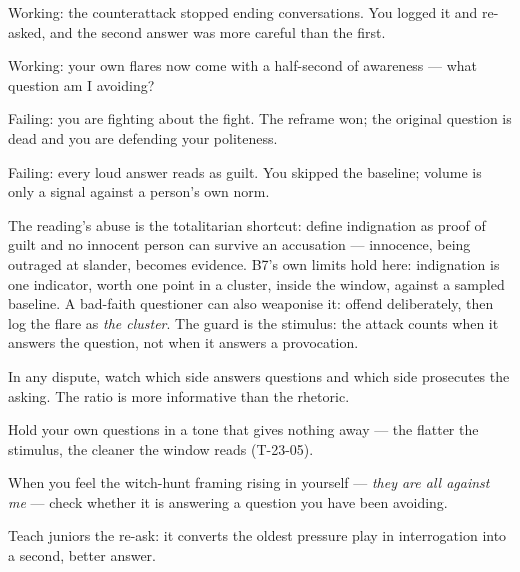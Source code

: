 \begin{feedback}
  \item Working: the counterattack stopped ending conversations. You logged it and re-asked, and the second answer was more careful than the first.
  \item Working: your own flares now come with a half-second of awareness --- what question am I avoiding?
  \item Failing: you are fighting about the fight. The reframe won; the original question is dead and you are defending your politeness.
  \item Failing: every loud answer reads as guilt. You skipped the baseline; volume is only a signal against a person's own norm.
\end{feedback}
\begin{failure}
The reading's abuse is the totalitarian shortcut: define indignation as proof of guilt and no innocent person can survive an accusation --- innocence, being outraged at slander, becomes evidence. B7's own limits hold here: indignation is one indicator, worth one point in a cluster, inside the window, against a sampled baseline. A bad-faith questioner can also weaponise it: offend deliberately, then log the flare as \emph{the cluster}. The guard is the stimulus: the attack counts when it answers the question, not when it answers a provocation.
\end{failure}
\begin{countermeasures}
  \item In any dispute, watch which side answers questions and which side prosecutes the asking. The ratio is more informative than the rhetoric.
  \item Hold your own questions in a tone that gives nothing away --- the flatter the stimulus, the cleaner the window reads (T-23-05).
  \item When you feel the witch-hunt framing rising in yourself --- \emph{they are all against me} --- check whether it is answering a question you have been avoiding.
  \item Teach juniors the re-ask: it converts the oldest pressure play in interrogation into a second, better answer.
\end{countermeasures}

\seesources
{}
